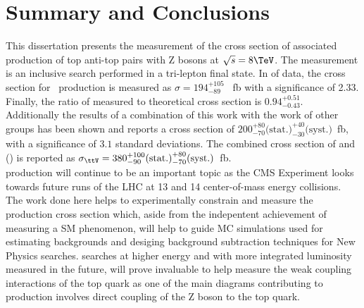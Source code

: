 \chapter{Summary and Conclusions}
\label {ch:conclusion}

This dissertation presents the measurement of the cross section of associated production of top anti-top pairs with Z bosons at $\sqrt{s} = 8 \TeV$. The measurement is an inclusive search performed in a tri-lepton final state. In \intLumi of data, the cross section for \ttZ \ production is measured as $\sigma=194 _{-89} ^{+105}$ \ fb with a significance of 2.33. Finally, the ratio of measured to theoretical cross section is $0.94_{-0.43} ^{+0.51}$.\\

Additionally the results of a combination of this work with the work of other groups has been shown and reports a \ttZ cross section of 
$200 ^{+80}_{-70} \textrm{(stat.)} ^{+40}_{-30} \textrm{(syst.)}$~fb, with a significance of $3.1$ standard deviations. The combined cross section of \ttZ and \ttW (\ttV) is reported as $\sigma_{\ttV} = 380 ^{+100}_{-90} \textrm{(stat.)} ^{+80}_{-70} \textrm{(syst.)}$~fb.\\

\ttZ production will continue to be an important topic as the CMS Experiment looks towards future runs of the LHC at 13 and 14 \TeV center-of-mass energy collisions. The work done here helps to experimentally constrain and measure the \ttZ production cross section which, aside from the indepentent achievement of measuring a SM phenomenon, will help to guide MC simulations used for estimating backgrounds and desiging background subtraction techniques for New Physics searches. \ttZ searches at higher energy and with more integrated luminosity measured in the future, will prove invaluable to help measure the weak coupling interactions of the top quark as one of the main diagrams contributing to \ttZ production involves direct coupling of the Z boson to the top quark.\\ 
